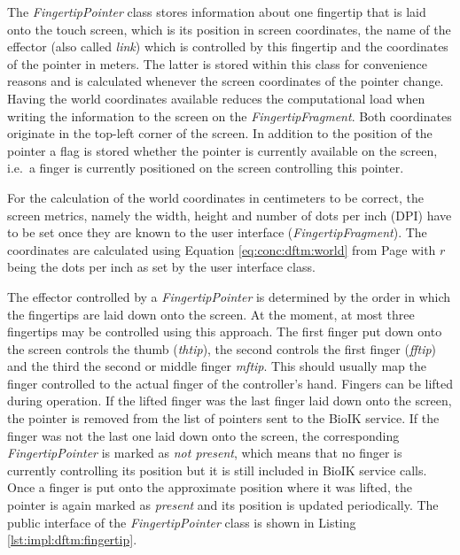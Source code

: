 The \textit{FingertipPointer} class stores information about one fingertip that is laid onto the touch screen, which is its position in screen coordinates, the name of the effector (also called \textit{link}) which is controlled by this fingertip and the coordinates of the pointer in meters. The latter is stored within this class for convenience reasons and is calculated whenever the screen coordinates of the pointer change. Having the world coordinates available reduces the computational load when writing the information to the screen on the \textit{FingertipFragment}. Both coordinates originate in the top-left corner of the screen. In addition to the position of the pointer a flag is stored whether the pointer is currently available on the screen, i.e.~a finger is currently positioned on the screen controlling this pointer.

For the calculation of the world coordinates in centimeters to be correct, the screen metrics, namely the width, height and number of dots per inch (DPI) have to be set once they are known to the user interface (\textit{FingertipFragment}). The coordinates are calculated using Equation \ref{eq:conc:dftm:world} from Page \pageref{eq:conc:dftm:world} with $r$ being the dots per inch as set by the user interface class.

The effector controlled by a \textit{FingertipPointer} is determined by the order in which the fingertips are laid down onto the screen. At the moment, at most three fingertips may be controlled using this approach. The first finger put down onto the screen controls the thumb (\textit{thtip}), the second controls the first finger (\textit{fftip}) and the third the second or middle finger \textit{mftip}. This should usually map the finger controlled to the actual finger of the controller's hand. Fingers can be lifted during operation. If the lifted finger was the last finger laid down onto the screen, the pointer is removed from the list of pointers sent to the BioIK service. If the finger was not the last one laid down onto the screen, the corresponding \textit{FingertipPointer} is marked as \textit{not present}, which means that no finger is currently controlling its position but it is still included in BioIK service calls. Once a finger is put onto the approximate position where it was lifted, the pointer is again marked as \textit{present} and its position is updated periodically. The public interface of the \textit{FingertipPointer} class is shown in Listing \ref{lst:impl:dftm:fingertip}.

